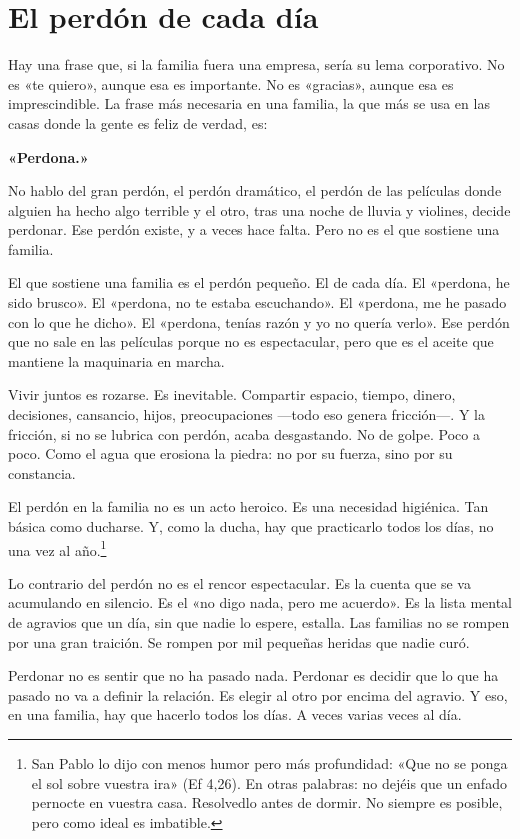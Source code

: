 \section{El perdón de cada día}

Hay una frase que, si la familia fuera una empresa, sería su lema corporativo. No es «te quiero», aunque esa es importante. No es «gracias», aunque esa es imprescindible. La frase más necesaria en una familia, la que más se usa en las casas donde la gente es feliz de verdad, es:

\textbf{«Perdona.»}

No hablo del gran perdón, el perdón dramático, el perdón de las películas donde alguien ha hecho algo terrible y el otro, tras una noche de lluvia y violines, decide perdonar. Ese perdón existe, y a veces hace falta. Pero no es el que sostiene una familia.

El que sostiene una familia es el perdón pequeño. El de cada día. El «perdona, he sido brusco». El «perdona, no te estaba escuchando». El «perdona, me he pasado con lo que he dicho». El «perdona, tenías razón y yo no quería verlo». Ese perdón que no sale en las películas porque no es espectacular, pero que es el aceite que mantiene la maquinaria en marcha.

Vivir juntos es rozarse. Es inevitable. Compartir espacio, tiempo, dinero, decisiones, cansancio, hijos, preocupaciones ---todo eso genera fricción---. Y la fricción, si no se lubrica con perdón, acaba desgastando. No de golpe. Poco a poco. Como el agua que erosiona la piedra: no por su fuerza, sino por su constancia.

El perdón en la familia no es un acto heroico. Es una necesidad higiénica. Tan básica como ducharse. Y, como la ducha, hay que practicarlo todos los días, no una vez al año.\footnote{San Pablo lo dijo con menos humor pero más profundidad: «Que no se ponga el sol sobre vuestra ira» (Ef 4,26). En otras palabras: no dejéis que un enfado pernocte en vuestra casa. Resolvedlo antes de dormir. No siempre es posible, pero como ideal es imbatible.}

Lo contrario del perdón no es el rencor espectacular. Es la cuenta que se va acumulando en silencio. Es el «no digo nada, pero me acuerdo». Es la lista mental de agravios que un día, sin que nadie lo espere, estalla. Las familias no se rompen por una gran traición. Se rompen por mil pequeñas heridas que nadie curó.

Perdonar no es sentir que no ha pasado nada. Perdonar es decidir que lo que ha pasado no va a definir la relación. Es elegir al otro por encima del agravio. Y eso, en una familia, hay que hacerlo todos los días. A veces varias veces al día.

